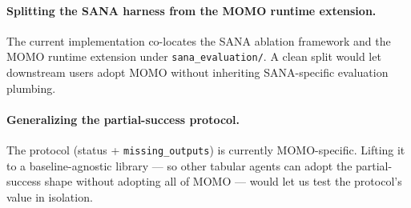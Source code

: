 \paragraph{Splitting the SANA harness from the MOMO runtime extension.} The current implementation co-locates the SANA ablation framework and the MOMO runtime extension under \texttt{sana\_evaluation/}. A clean split would let downstream users adopt MOMO without inheriting SANA-specific evaluation plumbing.

\paragraph{Generalizing the partial-success protocol.} The protocol (status + \texttt{missing\_outputs}) is currently MOMO-specific. Lifting it to a baseline-agnostic library --- so other tabular agents can adopt the partial-success shape without adopting all of MOMO --- would let us test the protocol's value in isolation.
